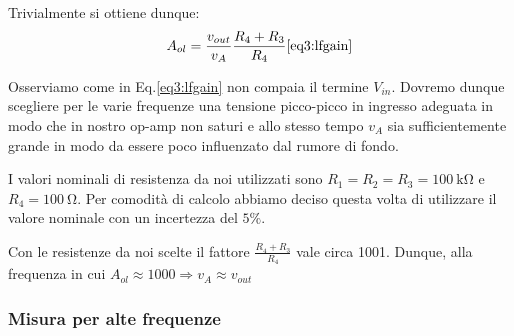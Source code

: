 Trivialmente si ottiene dunque:
\begin{equation}
A_{ol}=\frac{v_{out}}{v_A} \frac{R_4+R_3}{R_4}
\ref{eq3:lfgain}
\end{equation}

Osserviamo come in Eq.\ref{eq3:lfgain} non compaia il termine $V_{in}$. Dovremo dunque scegliere per le varie frequenze una tensione picco-picco in ingresso adeguata in modo che in nostro op-amp non saturi e allo stesso tempo $v_A$ sia sufficientemente grande in modo da essere poco influenzato dal rumore di fondo. 

I valori nominali di resistenza da noi utilizzati sono $R_1=R_2=R_3=\SI{100}{\kilo\ohm}$ e $R_4=\SI{100}{\ohm}$. Per comodità di calcolo abbiamo deciso questa volta di utilizzare il valore nominale con un incertezza del $5\%$. 

Con le resistenze da noi scelte il fattore $\frac{R_4+R_3}{R_4}$ vale circa 1001. Dunque, alla frequenza in cui $A_{ol} \approx 1000 \Rightarrow v_A \approx v_{out}$ 




\subsubsection{Misura per alte frequenze}





